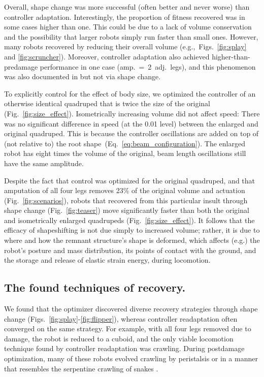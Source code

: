 Overall, shape change was more successful (often better and never worse) than controller adaptation.
Interestingly, the proportion of fitness recovered was in some cases higher than one.
This could be due to a lack of volume conservation and the possibility that larger robots simply run faster than small ones.
However, many robots recovered by reducing their overall volume (e.g.,~Figs.~\ref{fig:splay} and \ref{fig:scruncher}).
Moreover, controller adaptation also achieved higher-than-predamage performance in one case (amp.~=~2~adj.~legs), and this phenomenon was also documented in \cite{cully2015robots} but not via shape change.

To explicitly control for the effect of body size, we optimized the controller of an otherwise identical quadruped that is twice the size of the original (Fig.~\ref{fig:size_effect}).
Isometrically increasing volume did not affect speed: There was no significant difference in speed (at the 0.01 level) between the enlarged and original quadruped. 
This is because the controller oscillations are added on top of (not relative to) the root shape~(Eq.~\ref{eq:beam_configuration}).
The enlarged robot has eight times the volume of the original, beam length oscillations still have the same amplitude.





Despite the fact that control was optimized for the original quadruped, and that amputation of all four legs removes 23\% of the original volume and actuation (Fig.~\ref{fig:scenarios}), robots that recovered from this particular insult through shape change (Fig.~\ref{fig:teaser}) move significantly faster than both the original and isometrically enlarged quadrupeds (Fig.~\ref{fig:size_effect}).
It follows that the efficacy of shapeshifting is not due simply to increased volume; rather, it is due to where and how the remnant structure's shape is deformed, which affects (e.g.) the robot's posture and mass distribution, its points of contact with the ground, and the storage and release of elastic strain energy, during locomotion.


\subsection{The found techniques of recovery.}


We found that the optimizer discovered diverse recovery strategies through shape change (Figs.~\ref{fig:splay}-\ref{fig:flipper}), whereas controller readaptation often converged on the same strategy.
For example, with all four legs removed due to damage, the robot is reduced to a cuboid, and the only viable locomotion technique found by controller readaptation was crawling.
During postdamage optimization, many of these robots evolved crawling by peristalsis or in a manner that resembles the serpentine crawling of snakes \cite{alexander2003principles}.

